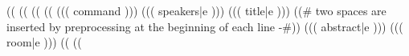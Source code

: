 

((%
((%
\noindent{}
\workshopspace((%
((%
\noindent((( command ))){%
  ((( speakers|e )))%
}{%
  ((( title|e )))%
}{%
}{%
((# two spaces are inserted by preprocessing at the beginning of each line -#))
((( abstract|e )))%
}%
{%
  ((( room|e )))%
}%
((%
((%


